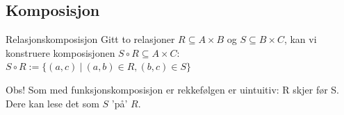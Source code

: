 \subsection{Komposisjon}

\begin{frame}{Relasjonskomposisjon}
    Gitt to relasjoner $R \subseteq A \times B$ og $S \subseteq B \times C$, kan vi konstruere komposisjonen $S \circ R \subseteq A \times C$:\\
    $S \circ R := \{(a, c) ~ | ~ (a, b) \in R, (b, c) \in S\}$
    \pause
    \begin{figure}%
        \centering
        \qquad
        \label{fig:ros}%
    \end{figure}
    \pause
    Obs! Som med funksjonskomposisjon er rekkefølgen er uintuitiv: R skjer før S. Dere kan lese det som $S$ 'på' $R$.
\end{frame}
